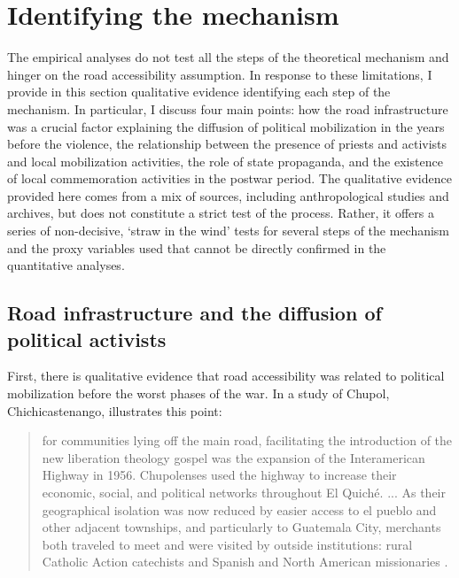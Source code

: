 \documentclass[12pt, notitlepage]{article}
\begin{document}
\section*{Identifying the mechanism}\label{sec:mechanism}

The empirical analyses do not test all the steps of the theoretical mechanism and hinger on the road accessibility assumption.
In response to these limitations, I provide in this section qualitative evidence identifying each step of the mechanism.
In particular, I discuss four main points: how the road infrastructure was a crucial factor explaining the diffusion of political mobilization in the years before the violence, the relationship between the presence of priests and activists and local mobilization activities, the role of state propaganda, and the existence of local commemoration activities in the postwar period.
The qualitative evidence provided here comes from a mix of sources, including anthropological studies and archives, but does not constitute a strict test of the process.
Rather, it offers a series of non-decisive, `straw in the wind' tests \citep{Collier:2011ve} for several steps of the mechanism and the proxy variables used that cannot be directly confirmed in the quantitative analyses.

\subsection*{Road infrastructure and the diffusion of political activists}

First, there is qualitative evidence that road accessibility was related to political mobilization before the worst phases of the war.
In a study of Chupol, Chichicastenango, \citet{Esparza:2018uw} illustrates this point:

\begin{quote}
  for communities lying off the main road, facilitating the introduction of the new liberation theology gospel was the expansion of the Interamerican Highway in 1956. Chupolenses used the highway to increase their economic, social, and political networks throughout El Quiché. ... As their geographical isolation was now reduced by easier access to el pueblo and other adjacent townships, and particularly to Guatemala City, merchants both traveled to meet and were visited by outside institutions: rural Catholic Action catechists and Spanish and North American missionaries \citep[93--94]{Esparza:2018uw}.
\end{quote}
\end{document}

